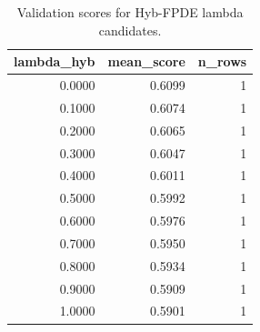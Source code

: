 \begin{table}[t]
\caption{Validation scores for Hyb-FPDE lambda candidates.}
\label{tab:lambda_distribution_computed}
\centering
\begin{tabular}{rrr}
\toprule
lambda\_hyb & mean\_score & n\_rows \\
\midrule
0.0000 & 0.6099 & 1 \\
0.1000 & 0.6074 & 1 \\
0.2000 & 0.6065 & 1 \\
0.3000 & 0.6047 & 1 \\
0.4000 & 0.6011 & 1 \\
0.5000 & 0.5992 & 1 \\
0.6000 & 0.5976 & 1 \\
0.7000 & 0.5950 & 1 \\
0.8000 & 0.5934 & 1 \\
0.9000 & 0.5909 & 1 \\
1.0000 & 0.5901 & 1 \\
\bottomrule
\end{tabular}

\end{table}
